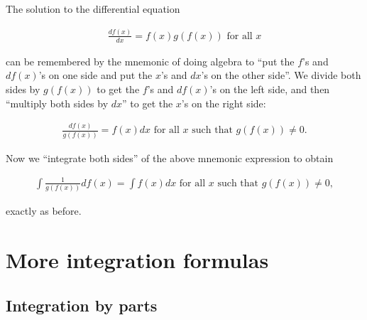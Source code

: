 The solution to the differential equation

\begin{align*}
    \frac{df(x)}{dx} = f(x) g(f(x)) \text{ for all $x$}
\end{align*}

can be remembered by the mnemonic of doing algebra to ``put the $f$'s and $df(x)$'s on one side and put the $x$'s and $dx$'s on the other side''. We divide both sides by $g(f(x))$ to get the $f$'s and $df(x)$'s on the left side, and then ``multiply both sides by $dx$'' to get the $x$'s on the right side: 

\begin{align*}
    \frac{df(x)}{g(f(x))} = f(x) dx \text{ for all $x$ such that $g(f(x)) \neq 0$}.
\end{align*}

Now we ``integrate both sides'' of the above mnemonic expression to obtain

\begin{align*}
    \int \frac{1}{g(f(x))} df(x) = \int f(x) dx \text{ for all $x$ such that $g(f(x)) \neq 0$},
\end{align*}

exactly as before.

\section*{More integration formulas}

\subsection*{Integration by parts}

